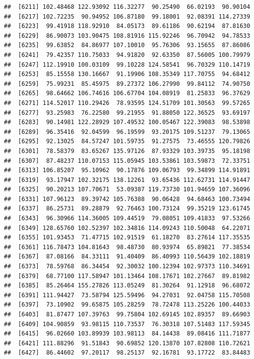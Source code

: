 \documentclass[
]{article}
\begin{document}
\begin{verbatim}
##  [6211] 102.48468 122.93092 116.32277  90.25490  66.02193  90.90104
##  [6217] 102.72235  90.94952 106.87180  99.18001  92.08391 114.27339
##  [6223]  99.41918 118.92910  84.05173  89.61186  90.62194  87.81630
##  [6229]  86.90073 103.90475 108.81916 115.92246  96.70942  94.78533
##  [6235]  99.63852  84.86977 107.10010  95.76306  93.15655  87.86086
##  [6241]  79.42357 110.75033  94.91820  92.63350  87.56005 100.79979
##  [6247] 112.19910 100.03109  99.10228 124.58541  96.70329 110.14719
##  [6253]  85.15558 130.16667  91.19906 108.35349 117.70755  94.68412
##  [6259]  75.99231  85.45975  89.27372 106.27990  99.84112  74.90750
##  [6265]  98.64662 106.74616 106.67704 104.08919  81.25833  96.37629
##  [6271] 114.52017 110.29426  78.93595 124.51709 101.30563  99.57265
##  [6277]  93.25983  76.22580  99.21955  91.88050 122.36525  93.69197
##  [6283]  90.14981 122.28929 107.49532 100.05467 122.39083  98.53898
##  [6289]  96.35416  92.04599  96.19599  93.20175 109.51237  79.13065
##  [6295]  92.13025  84.57247 101.59735  91.27575  73.46555 120.79826
##  [6301]  78.58379  83.65267 135.97126  87.93329 103.39735  95.18198
##  [6307]  87.48237 110.07153 115.05945 103.53861 103.59873  72.33751
##  [6313] 106.85207  95.10962  90.17876 109.06793  99.34899 114.91891
##  [6319]  93.17947 102.32175 138.12261  93.65436 112.62731 114.91447
##  [6325]  90.20213 107.70671  53.09387 119.73730 101.94659 107.36096
##  [6331] 107.96123  89.39742 105.76388  90.06428  94.68463 100.73494
##  [6337]  86.25731  89.28879  92.76463 100.73124  99.35219 123.61745
##  [6343]  96.30966 114.36005 109.44519  79.08051 109.41833  97.53266
##  [6349] 128.65760 102.52397 102.34816 114.09243 110.50048  64.22071
##  [6355] 101.93453  71.47715 102.91519  61.18270  83.27614 117.35535
##  [6361] 116.78473 104.81643  98.48730  80.93974  65.89821  77.38534
##  [6367]  87.08166  84.33111  91.40409  86.40993 110.56439 102.18819
##  [6373]  78.59768  86.34454  92.30032 100.12394 102.97373 110.34691
##  [6379]  68.77100 117.58947 101.13464 108.17671 102.27667  89.81982
##  [6385]  85.26464 155.27826 113.05249  81.30264  91.12918  96.68072
##  [6391] 111.94427  73.58794 125.59496  94.27031  92.04758 115.70508
##  [6397]  73.10902  99.65875 105.28259  78.72478 113.25226 100.44033
##  [6403]  81.87477 107.39763  99.75804 102.69145 102.89357  89.66903
##  [6409] 104.90859  93.98115 110.73537  76.30318 107.51483 117.59345
##  [6415]  96.02660 103.89939 103.98113  84.14438  89.08416 111.71877
##  [6421] 111.88296  91.51843  90.69852 120.13870 107.82808 110.72621
##  [6427]  86.44602  97.20117  98.25137  92.16781  93.17722  83.84483

\end{verbatim}
\end{document}
